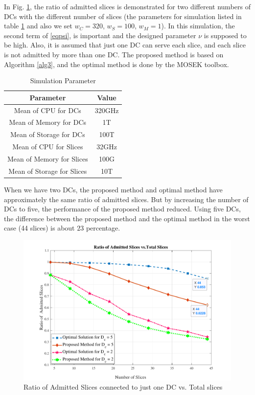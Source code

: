 \documentclass[conference]{IEEEtran}
\begin{document}
In Fig. \ref{fig:f1}, the ratio of admitted slices is demonstrated for two different numbers of DCs with the different number of slices (the parameters for simulation listed in table \ref{table:1} and also we set $w_C = 320$, $w_S = 100$, $w_M =1$). In this simulation, the second term of \eqref{eqpsi}, is important and the designed parameter $\nu$ is supposed to be high.
Also, it is assumed that just one DC can serve each slice, and each slice is not admitted by more than one DC. 
The proposed method is based on Algorithm \ref{alg3}, and the optimal method is done by the MOSEK toolbox.
\begin{small}
 \begin{table}
 \caption {Simulation Parameter} \label{table:1}
 \begin{center}
  \begin{tabular}{||c c ||}
  \hline
  Parameter & Value \\ [0.5ex]
  \hline\hline
  Mean of CPU for DCs & 320GHz\\
  \hline
  Mean of Memory for DCs & 1T\\
  \hline
 Mean of Storage for DCs & 100T \\
  \hline
   Mean of CPU for Slices & 32GHz\\
  \hline
  Mean of Memory for Slices & 100G\\
  \hline
 Mean of Storage for Slices & 10T \\ [1ex]
  \hline
 \end{tabular}
 \end{center}
 \end{table}
\end{small}
When we have two DCs, the proposed method and optimal method have approximately the same ratio of admitted slices. But by increasing the number of DCs to five, the performance of the proposed method reduced. Using five DCs, the difference between the
proposed method and the optimal method in the worst case (44 slices) is about $23$ percentage.
\begin{figure}%
  \centering
    \includegraphics[width=\linewidth]{f112}
  \caption{Ratio of Admitted Slices connected to just one DC vs. Total slices}
  \label{fig:f1}
\end{figure}
\end{document}
